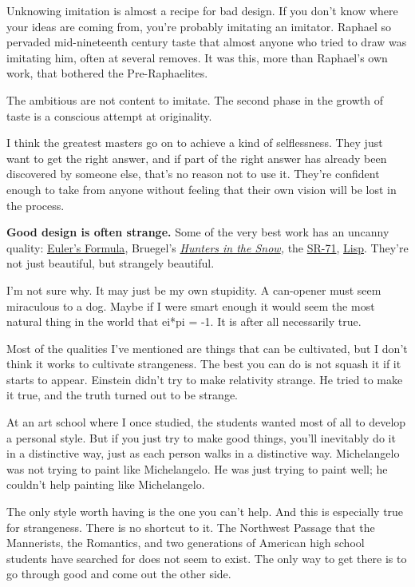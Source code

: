 Unknowing imitation is almost a recipe for bad design. If you don't know
where your ideas are coming from, you're probably imitating an imitator.
Raphael so pervaded mid-nineteenth century taste that almost anyone who
tried to draw was imitating him, often at several removes. It was this,
more than Raphael's own work, that bothered the Pre-Raphaelites.

The ambitious are not content to imitate. The second phase in the growth
of taste is a conscious attempt at originality.

I think the greatest masters go on to achieve a kind of selflessness.
They just want to get the right answer, and if part of the right answer
has already been discovered by someone else, that's no reason not to use
it. They're confident enough to take from anyone without feeling that
their own vision will be lost in the process.

\textbf{Good design is often strange.} Some of the very best work has an
uncanny quality:
\href{http://mathworld.wolfram.com/EulerFormula.html}{Euler's Formula},
Bruegel's \emph{\href{hunters.html}{Hunters in the Snow},} the
\href{sr71.html}{SR-71}, \href{rootsoflisp.html}{Lisp}. They're not just
beautiful, but strangely beautiful.

I'm not sure why. It may just be my own stupidity. A can-opener must
seem miraculous to a dog. Maybe if I were smart enough it would seem the
most natural thing in the world that ei*pi = -1. It is after all
necessarily true.

Most of the qualities I've mentioned are things that can be cultivated,
but I don't think it works to cultivate strangeness. The best you can do
is not squash it if it starts to appear. Einstein didn't try to make
relativity strange. He tried to make it true, and the truth turned out
to be strange.

At an art school where I once studied, the students wanted most of all
to develop a personal style. But if you just try to make good things,
you'll inevitably do it in a distinctive way, just as each person walks
in a distinctive way. Michelangelo was not trying to paint like
Michelangelo. He was just trying to paint well; he couldn't help
painting like Michelangelo.

The only style worth having is the one you can't help. And this is
especially true for strangeness. There is no shortcut to it. The
Northwest Passage that the Mannerists, the Romantics, and two
generations of American high school students have searched for does not
seem to exist. The only way to get there is to go through good and come
out the other side.

